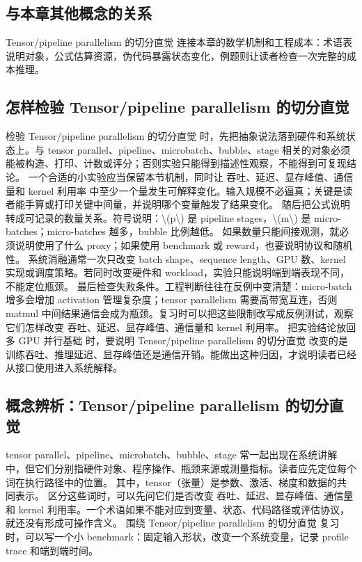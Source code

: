 \documentclass[a4paper]{article}
\begin{document}
\subsection{与本章其他概念的关系}
Tensor/pipeline parallelism 的切分直觉 连接本章的数学机制和工程成本：术语表说明对象，公式估算资源，伪代码暴露状态变化，例题则让读者检查一次完整的成本推理。
\subsection{怎样检验 Tensor/pipeline parallelism 的切分直觉}
检验 Tensor/pipeline parallelism 的切分直觉 时，先把抽象说法落到硬件和系统状态上。与 tensor parallel、pipeline、microbatch、bubble、stage 相关的对象必须能被构造、打印、计数或评分；否则实验只能得到描述性观察，不能得到可复现结论。
一个合适的小实验应当保留本节机制，同时让 吞吐、延迟、显存峰值、通信量和 kernel 利用率 中至少一个量发生可解释变化。输入规模不必逼真；关键是读者能手算或打印关键中间量，并说明哪个变量触发了结果变化。
随后把公式说明转成可记录的数量关系。符号说明：\textbackslash{}(p\textbackslash{}) 是 pipeline stages，\textbackslash{}(m\textbackslash{}) 是 micro-batches；micro-batches 越多，bubble 比例越低。 如果数量只能间接观测，就必须说明使用了什么 proxy；如果使用 benchmark 或 reward，也要说明协议和随机性。
系统消融通常一次只改变 batch shape、sequence length、GPU 数、kernel 实现或调度策略。若同时改变硬件和 workload，实验只能说明端到端表现不同，不能定位瓶颈。
最后检查失败条件。工程判断往往在反例中变清楚：micro-batch 增多会增加 activation 管理复杂度；tensor parallelism 需要高带宽互连，否则 matmul 中间结果通信会成为瓶颈。复习时可以把这些限制改写成反例测试，观察它们怎样改变 吞吐、延迟、显存峰值、通信量和 kernel 利用率。
把实验结论放回 多 GPU 并行基础 时，要说明 Tensor/pipeline parallelism 的切分直觉 改变的是训练吞吐、推理延迟、显存峰值还是通信开销。能做出这种归因，才说明读者已经从接口使用进入系统解释。
\subsection{概念辨析：Tensor/pipeline parallelism 的切分直觉}
tensor parallel、pipeline、microbatch、bubble、stage 常一起出现在系统讲解中，但它们分别指硬件对象、程序操作、瓶颈来源或测量指标。读者应先定位每个词在执行路径中的位置。
其中，tensor（张量）是参数、激活、梯度和数据的共同表示。
区分这些词时，可以先问它们是否改变 吞吐、延迟、显存峰值、通信量和 kernel 利用率。一个术语如果不能对应到变量、状态、代码路径或评估协议，就还没有形成可操作含义。
围绕 Tensor/pipeline parallelism 的切分直觉 复习时，可以写一个小 benchmark：固定输入形状，改变一个系统变量，记录 profile trace 和端到端时间。
\end{document}
